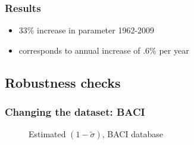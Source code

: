 \documentclass{beamer}
\begin{document}
\fi
\begin{frame}[plain]\frametitle{Results}
\begin{figure}[h!]
\begin{center}
\setlength{\fboxrule}{1pt} %
\setlength{\fboxsep}{.1in} %
\end{center}
\end{figure}
\begin{itemize}
\item 33\% increase in parameter 1962-2009
\item corresponds to annual increase of .6\% per year 
\end{itemize}
\end{frame}

\subsection{Robustness checks}
\begin{frame}[plain]\frametitle{Changing the dataset: BACI}
\begin{figure}[h!]
\begin{center}
\setlength{\fboxrule}{1pt} %
\setlength{\fboxsep}{.1in} %
\end{center}
\caption{Estimated $(1-\widetilde{\sigma})$, BACI database \label{fig:baci}}
\end{figure}
\end{frame}
\end{document}
